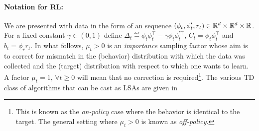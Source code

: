 \paragraph{Notation for RL:} We are presented with data in the form of an \iid sequence $(\phi_t,\phi'_t,r_t)\in \mathbb{R}^d\times\mathbb{R}^d\times \mathbb{R}$. For a fixed constant $\gamma \in (0,1)$ define  $\Delta_t\eqdef \phi_t\phi_t^\top-\gamma \phi_t\phi_t^{'\top}$, $C_t=\phi_t\phi_t^\top$ and $b_t=\phi_r r_t$. In what follows, $\mu_t>0$ is an \emph{importance} sampling factor whose aim is to correct for mismatch in the (behavior) distribution with which the data was collected and the (target) distribution with respect to which one wants to learn. A factor $\mu_t=1,\,\forall t\geq 0$ will mean that no correction is required\footnote{This is known as the \emph{on-policy} case where the behavior is identical to the target. The general setting where $\mu_t>0$ is known as \emph{off-policy}.}. The various TD class of algorithms that can be cast as LSAs are given in 
\FloatBarrier
\begin{table}[h]
\label{tb:tdalgo}
\caption{Some popular TD algorithms with rates known in literature \cite{korda-prashanth,gtd2,gtdmp}. }
\end{table}
